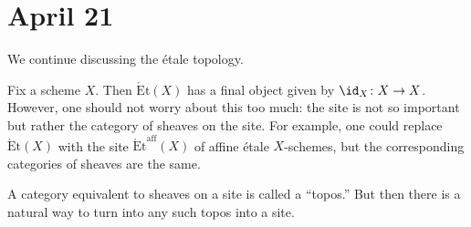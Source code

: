 \documentclass[../notes.tex]{subfiles}
\begin{document}
\section{April 21}

We continue discussing the \'etale topology.
\begin{remark}
	Fix a scheme $X$. Then $\mathrm{\acute Et}(X)$ has a final object given by $\id_X\colon X\to X$. However, one should not worry about this too much: the site is not so important but rather the category of sheaves on the site. For example, one could replace $\mathrm{\acute Et}(X)$ with the site $\mathrm{\acute Et}^{\mathrm{aff}}(X)$ of affine \'etale $X$-schemes, but the corresponding categories of sheaves are the same.
\end{remark}
\begin{remark}
	A category equivalent to sheaves on a site is called a ``topos.'' But then there is a natural way to turn into any such topos into a site.
\end{remark}
\end{document}
